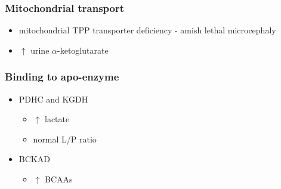 \documentclass{scrartcl}
\begin{document}
\subsubsection{Mitochondrial transport}
\label{sec:org017daa7}
\begin{itemize}
\item mitochondrial TPP transporter deficiency - amish lethal microcephaly
\item \(\uparrow\) urine \(\alpha\)-ketoglutarate
\end{itemize}
\subsubsection{Binding to apo-enzyme}
\label{sec:org5716daa}
\begin{itemize}
\item PDHC and KGDH
\begin{itemize}
\item \(\uparrow\) lactate
\item normal L/P ratio
\end{itemize}
\item BCKAD
\begin{itemize}
\item \(\uparrow\) BCAAs
\end{itemize}
\end{itemize}
\end{document}
